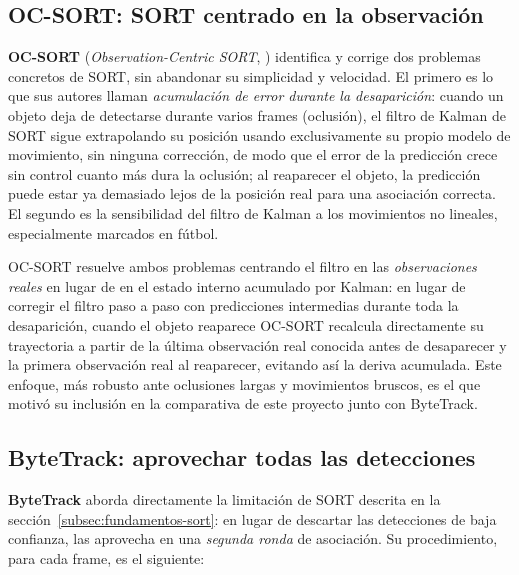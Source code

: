 \subsection{OC-SORT: SORT centrado en la observación}
\label{subsec:fundamentos-ocsort}

\textbf{OC-SORT} (\emph{Observation-Centric SORT}, \citealp{cao2023ocsort})
identifica y corrige dos problemas concretos de SORT, sin abandonar su
simplicidad y velocidad. El primero es lo que sus autores llaman
\emph{acumulación de error durante la desaparición}: cuando un objeto deja
de detectarse durante varios frames (oclusión), el filtro de Kalman de
SORT sigue extrapolando su posición usando exclusivamente su propio modelo
de movimiento, sin ninguna corrección, de modo que el error de la
predicción crece sin control cuanto más dura la oclusión; al reaparecer el
objeto, la predicción puede estar ya demasiado lejos de la posición real
para una asociación correcta. El segundo es la sensibilidad del filtro de
Kalman a los movimientos no lineales,
especialmente marcados en fútbol.

OC-SORT resuelve ambos problemas centrando el filtro en las
\emph{observaciones reales} en lugar de en el estado interno acumulado por
Kalman: en lugar de corregir el filtro paso a paso con predicciones
intermedias durante toda la desaparición, cuando el objeto reaparece
OC-SORT recalcula directamente su trayectoria a partir de la última
observación real conocida antes de desaparecer y la primera observación
real al reaparecer, evitando así la deriva acumulada. Este enfoque, más
robusto ante oclusiones largas y movimientos bruscos, es el que motivó su
inclusión en la comparativa de este proyecto junto con ByteTrack.

\subsection{ByteTrack: aprovechar todas las detecciones}
\label{subsec:fundamentos-bytetrack}

\textbf{ByteTrack} \citep{zhang2022bytetrack, ultralytics2026trackingtools} aborda directamente la
limitación de SORT descrita en la sección~\ref{subsec:fundamentos-sort}: en
lugar de descartar las detecciones de baja confianza, las aprovecha en una
\emph{segunda ronda} de asociación. Su procedimiento, para cada frame, es
el siguiente:

